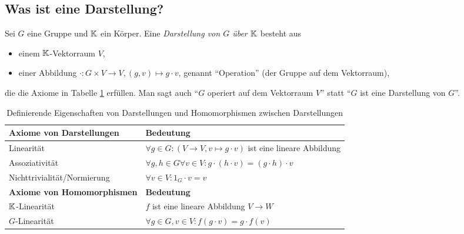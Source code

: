 
\subsection{Was ist eine Darstellung?}

\begin{definition}[Darstellungen]\label{darstellungen:def}
Sei $G$ eine Gruppe und $\mathbb{K}$ ein Körper. Eine \emph{Darstellung von $G$ über $\mathbb{K}$} besteht aus
\begin{itemize}
	\item einem $\mathbb{K}$-Vektorraum $V$,
	\item einer Abbildung $\cdot: G \times V \to V, (g,v) \mapsto g\cdot v$, genannt \enquote{Operation} (der Gruppe auf dem Vektorraum),
\end{itemize}
die die Axiome in Tabelle \ref{darstellungen:def_table} erfüllen. Man sagt auch \enquote{$G$ operiert auf dem Vektorraum $V$} statt \enquote{$G$ ist eine Darstellung von $G$}.

\begin{table}[!ht]
	\setlength\extrarowheight{10pt} %
	\begin{tabularx}{\textwidth}{p{7cm} X}
		
		\toprule
		\textbf{Axiome von Darstellungen}                    & \textbf{Bedeutung} \\
		\midrule
        \hspace{1cm}Linearität                               & $\forall g\in G: (V\to V, v\mapsto g\cdot v)$ ist eine lineare Abbildung \\
		\hspace{1cm}Assoziativität                           & $\forall g,h\in G\forall v\in V: g\cdot (h\cdot v)=(g\cdot h)\cdot v$  \\
		\hspace{1cm}Nichttrivialität/Normierung              & $\forall v\in V: 1_G\cdot v=v$  \\
		\textbf{Axiome von Homomorphismen}                   & \textbf{Bedeutung} \\
        \midrule
        \hspace{1cm}$\mathbb{K}$-Linearität & $f$ ist eine lineare Abbildung $V\to W$ \\
        \hspace{1cm}$G$-Linearität & $\forall g\in G, v\in V: f(g\cdot v) = g\cdot f(v)$ \\
        \bottomrule
	\end{tabularx}
	\caption{Definierende Eigenschaften von Darstellungen und Homomorphismen zwischen Darstellungen}
    \label{darstellungen:def_table}
\end{table}


\end{definition}
